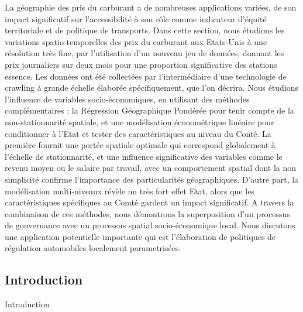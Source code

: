 {La géographie des pris du carburant a de nombreuses applications variées, de son impact significatif sur l'accessibilité à son rôle comme indicateur d'équité territoriale et de politique de transports. Dans cette section, nous étudions les variations spatio-temporelles des prix du carburant aux Etats-Unis à une résolution très fine, par l'utilisation d'un nouveau jeu de données, donnant les prix journaliers sur deux mois pour une proportion significative des stations essence. Les données ont été collectées par l'intermédiaire d'une technologie de crawling à grande échelle élaborée spécifiquement, que l'on décrira. Nous étudions l'influence de variables socio-économiques, en utilisant des méthodes complémentaires : la Régression Géographique Pondérée pour tenir compte de la non-stationnarité spatiale, et une modélisation économétrique linéaire pour conditionner à l'Etat et tester des caractéristiques au niveau du Conté. La première fournit une portée spatiale optimale qui correspond globalement à l'échelle de stationnarité, et une influence significative des variables comme le revenu moyen ou le salaire par travail, avec un comportement spatial dont la non simplicité confirme l'importance des particularités géographiques. D'autre part, la modélisation multi-niveaux révèle un très fort effet Etat, alors que les caractéristiques spécifiques au Comté gardent un impact significatif. A travers la combinaison de ces méthodes, nous démontrons la superposition d'un processus de gouvernance avec un processus spatial socio-économique local. Nous discutons une application potentielle importante qui est l'élaboration de politiques de régulation automobiles localement parametrisées.
}




\subsection{Introduction}{Introduction}
\label{main}


